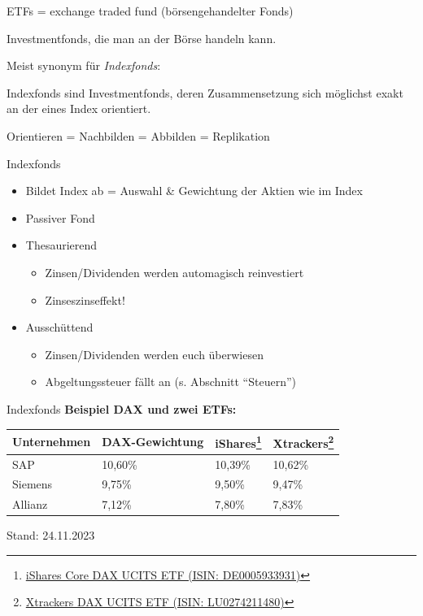 \documentclass{beamer}
\begin{document}
			\begin{frame}
				ETFs = exchange traded fund (börsengehandelter Fonds)
				\begin{definition}
					Investmentfonds, die man an der Börse handeln kann.
				\end{definition}
				Meist synonym für \textit{Indexfonds}:\pause
				\begin{definition}
					Indexfonds sind Investmentfonds, deren Zusammensetzung sich möglichst exakt an der eines Index orientiert.\citewiki{Indexfonds}
				\end{definition}
				Orientieren = Nachbilden = Abbilden = Replikation
			\end{frame}
		
			\begin{frame}{Indexfonds}
				\begin{itemize}
					\item Bildet Index ab = Auswahl \& Gewichtung der Aktien wie im Index
					\item Passiver Fond\pause
					\item Thesaurierend
					\begin{itemize}
						\item Zinsen/Dividenden werden automagisch reinvestiert
						\item Zinseszinseffekt!
					\end{itemize}\pause
					\item Ausschüttend
					\begin{itemize}
						\item Zinsen/Dividenden werden euch überwiesen
						\item Abgeltungssteuer fällt an (s. Abschnitt "`Steuern"')
					\end{itemize}
				\end{itemize}
			\end{frame}
		
			\begin{frame}{Indexfonds}
				\textbf{Beispiel DAX und zwei ETFs:}
				\vspace{0.25cm}
				\begin{tabularx}{\linewidth}{X|p{3cm}|X|X}
					Unternehmen & DAX-Gewichtung & iShares\footnote{\href{https://de.extraetf.com/etf-profile/DE0005933931?tab=components}{iShares Core DAX UCITS ETF (ISIN: DE0005933931)}} & Xtrackers\footnote{\href{https://de.extraetf.com/etf-profile/LU0274211480?tab=components}{Xtrackers DAX UCITS ETF (ISIN: LU0274211480)}}\\
					\hline
					SAP		& 10,60\%	& 10,39\%	& 10,62\% \\
					Siemens	&  9,75\%	&  9,50\%	&  9,47\% \\
					Allianz	&  7,12\%	&  7,80\%	&  7,83\%
				\end{tabularx}
				{\tiny Stand: 24.11.2023}
			\end{frame}
		
\end{document}
